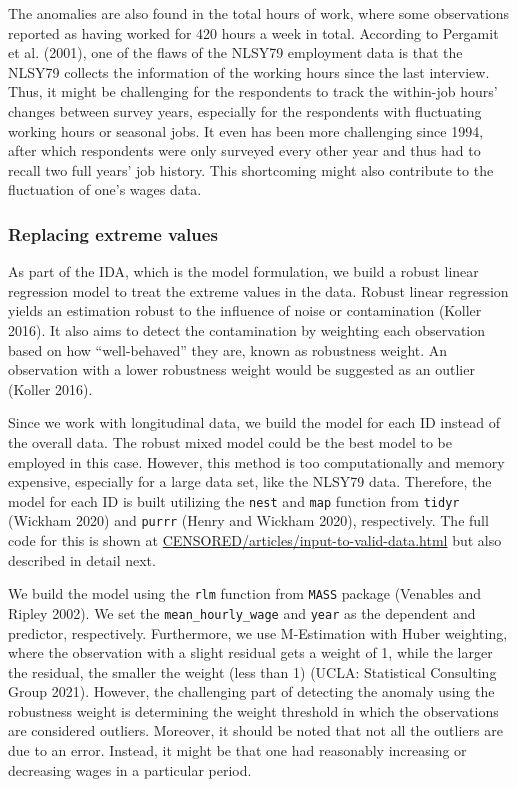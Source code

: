\documentclass{article}
\begin{document}
The anomalies are also found in the total hours of work, where some observations reported as having worked for 420 hours a week in total. According to Pergamit et al. (2001), one of the flaws of the NLSY79 employment data is that the NLSY79 collects the information of the working hours since the last interview. Thus, it might be challenging for the respondents to track the within-job hours' changes between survey years, especially for the respondents with fluctuating working hours or seasonal jobs. It even has been more challenging since 1994, after which respondents were only surveyed every other year and thus had to recall two full years' job history. This shortcoming might also contribute to the fluctuation of one's wages data.

\hypertarget{censor}{%
\subsubsection{Replacing extreme values}\label{censor}}

As part of the IDA, which is the model formulation, we build a robust linear regression model to treat the extreme values in the data. Robust linear regression yields an estimation robust to the influence of noise or contamination (Koller 2016). It also aims to detect the contamination by weighting each observation based on how ``well-behaved'' they are, known as robustness weight. An observation with a lower robustness weight would be suggested as an outlier (Koller 2016).

Since we work with longitudinal data, we build the model for each ID instead of the overall data. The robust mixed model could be the best model to be employed in this case. However, this method is too computationally and memory expensive, especially for a large data set, like the NLSY79 data. Therefore, the model for each ID is built utilizing the \texttt{nest} and \texttt{map} function from \texttt{tidyr} (Wickham 2020) and \texttt{purrr} (Henry and Wickham 2020), respectively. The full code for this is shown at \url{CENSORED/articles/input-to-valid-data.html} but also described in detail next.

We build the model using the \texttt{rlm} function from \texttt{MASS} package (Venables and Ripley 2002). We set the \texttt{mean\_hourly\_wage} and \texttt{year} as the dependent and predictor, respectively. Furthermore, we use M-Estimation with Huber weighting, where the observation with a slight residual gets a weight of 1, while the larger the residual, the smaller the weight (less than 1) (UCLA: Statistical Consulting Group 2021). However, the challenging part of detecting the anomaly using the robustness weight is determining the weight threshold in which the observations are considered outliers. Moreover, it should be noted that not all the outliers are due to an error. Instead, it might be that one had reasonably increasing or decreasing wages in a particular period.
\end{document}
